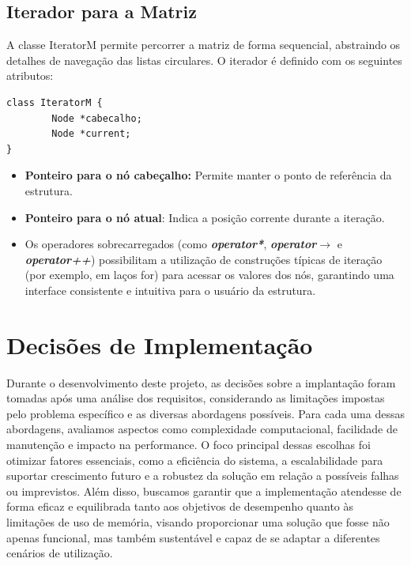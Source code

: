 \documentclass[12pt]{article}
\begin{document}
\subsection{Iterador para a Matriz}
A classe IteratorM permite percorrer a matriz de forma sequencial, abstraindo os detalhes de navegação das listas circulares. O iterador é definido com os seguintes atributos:

\begin{lstlisting}[caption={Estrutura do Iterator em C++}]
    class IteratorM {
        Node *cabecalho;
        Node *current;
}
\end{lstlisting}

\begin{itemize}
    \item \textbf{Ponteiro para o nó cabeçalho:} Permite manter o ponto de referência da estrutura.
    \item \textbf{Ponteiro para o nó atual}: Indica a posição corrente durante a iteração.
    \item Os operadores sobrecarregados (como \textbf{\textit{operator*}}, \textbf{\textit{operator\(\xrightarrow{}\)}} e \textbf{\textit{operator++}}) possibilitam a utilização de construções típicas de iteração (por exemplo, em laços for) para acessar os valores dos nós, garantindo uma interface consistente e intuitiva para o usuário da estrutura.
\end{itemize}

\section{Decisões de Implementação}
Durante o desenvolvimento deste projeto, as decisões sobre a implantação foram tomadas após uma análise dos requisitos, considerando as limitações impostas pelo problema específico e as diversas abordagens possíveis. Para cada uma dessas abordagens, avaliamos aspectos como complexidade computacional, facilidade de manutenção e impacto na performance. O foco principal dessas escolhas foi otimizar fatores essenciais, como a eficiência do sistema, a escalabilidade para suportar crescimento futuro e a robustez da solução em relação a possíveis falhas ou imprevistos. Além disso, buscamos garantir que a implementação atendesse de forma eficaz e equilibrada tanto aos objetivos de desempenho quanto às limitações de uso de memória, visando proporcionar uma solução que fosse não apenas funcional, mas também sustentável e capaz de se adaptar a diferentes cenários de utilização.
\end{document}
